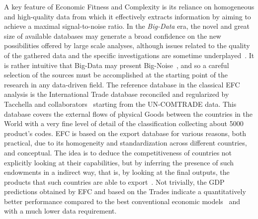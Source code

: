 \documentclass[fleqn,10pt]{article}
\begin{document}
A key feature of Economic Fitness and Complexity is its reliance on homogeneous and high-quality data from which it effectively extracts information by aiming to achieve a maximal signal-to-noise ratio.
In the \emph{Big-Data} era, the novel and great size of available databases may generate a broad confidence on the new possibilities offered by large scale analyses, although issues related to the quality of the gathered data and the specific investigations are sometime underplayed~\cite{Hosni2018}.
It is rather intuitive that Big-Data may present Big-Noise~\cite{Silver2012}, and so a careful selection of the sources must be accomplished at the starting point of the research in any data-driven field. 
The reference database in the classical EFC analysis is the International Trade database reconciled and regularized by Tacchella and collaborators~\cite{Tacchella2018} starting from the UN-COMTRADE data. 
This database covers the external flows of physical Goods between the countries in the World with a very fine level of detail of the classification collecting about 5000 product's codes. 
EFC is based on the export database for various reasons, both practical, due to its homogeneity and standardization across different countries, and conceptual. 
The idea is to deduce the competitiveness of countries not explicitly looking at their capabilities, but by inferring the presence of such endowments in a indirect way, that is, by looking at the final outputs, the products that such countries are able to export~\cite{hausmann2007you}. 
Not trivially, the GDP predictions obtained by EFC and based on the Trades indicate a quantitatively better performance compared to the best conventional economic models~\cite{Tacchella2018} and with a much lower data requirement.
\end{document}
